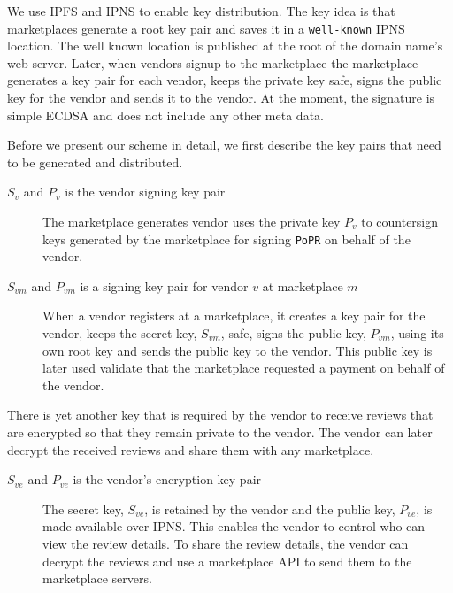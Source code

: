\documentclass[a4paper]{article}
\begin{document}
We use IPFS and IPNS to enable key distribution. The key idea is that
marketplaces generate a root key pair and saves it in a
\texttt{well-known}\cite{wellknown} IPNS location. The well known
location is published at the root of the domain name's web
server. Later, when vendors signup to the marketplace the marketplace
generates a key pair for each vendor, keeps the private key safe,
signs the public key for the vendor and sends it to the vendor. At the
moment, the signature is simple ECDSA and does not include any other
meta data.

Before we present our scheme in detail, we first describe the key
pairs that need to be generated and distributed.

\begin{description}

\item[$S_v$ and $P_v$ is the vendor signing key pair] The marketplace
  generates vendor uses the private key $P_v$ to countersign keys
  generated by the marketplace for signing \texttt{PoPR} on behalf of
  the vendor.
  
\item[$S_{vm}$ and $P_{vm}$ is a signing key pair for vendor $v$ at
  marketplace $m$] When a vendor registers at a marketplace, it
  creates a key pair for the vendor, keeps the secret key, $S_{vm}$,
  safe, signs the public key, $P_{vm}$, using its own root key and
  sends the public key to the vendor. This public key is later used
  validate that the marketplace requested a payment on behalf of the
  vendor.

\end{description}

There is yet another key that is required by the vendor to receive
reviews that are encrypted so that they remain private to the
vendor. The vendor can later decrypt the received reviews and share
them with any marketplace.

\begin{description}
  
\item[$S_{ve}$ and $P_{ve}$ is the vendor's encryption key pair] The
  secret key, $S_{ve}$, is retained by the vendor and the public key,
  $P_{ve}$, is made available over IPNS\cite{ipfs}. This enables the
  vendor to control who can view the review details. To share the
  review details, the vendor can decrypt the reviews and use a
  marketplace API to send them to the marketplace servers.
  
\end{description}
\end{document}

